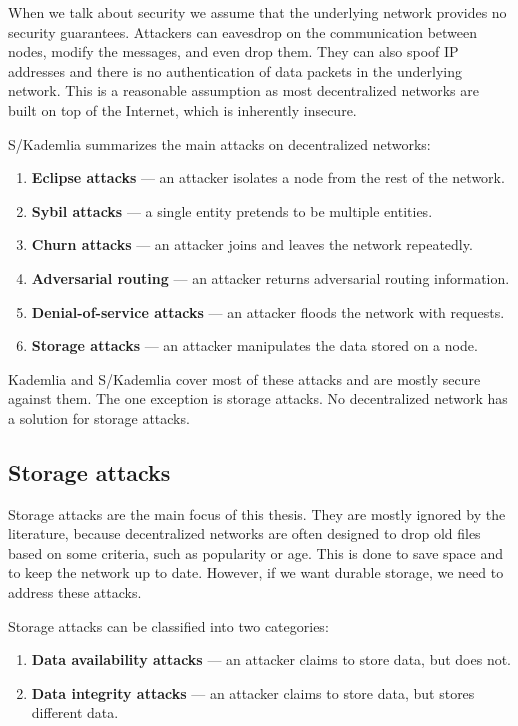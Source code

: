 When we talk about security we assume that the underlying network provides no security guarantees.
Attackers can eavesdrop on the communication between nodes, modify the messages, and even drop them.
They can also spoof IP addresses and there is no authentication of data packets in the underlying network.
This is a reasonable assumption as most decentralized networks are built on top of the Internet,
which is inherently insecure.

S/Kademlia \cite{skademlia} summarizes the main attacks on decentralized networks:
\begin{enumerate}
    \item \textbf{Eclipse attacks} --- an attacker isolates a node from the rest of the network.
    \item \textbf{Sybil attacks} --- a single entity pretends to be multiple entities.
    \item \textbf{Churn attacks} --- an attacker joins and leaves the network repeatedly.
    \item \textbf{Adversarial routing} --- an attacker returns adversarial routing information.
    \item \textbf{Denial-of-service attacks} --- an attacker floods the network with requests.
    \item \textbf{Storage attacks} --- an attacker manipulates the data stored on a node.
\end{enumerate}

Kademlia and S/Kademlia cover most of these attacks and are mostly secure against them.
The one exception is storage attacks.
No decentralized network has a solution for storage attacks.

\subsection{Storage attacks}
\label{section:storage-attacks}

Storage attacks are the main focus of this thesis.
They are mostly ignored by the literature, because decentralized networks are often designed to
drop old files based on some criteria, such as popularity or age.
This is done to save space and to keep the network up to date.
However, if we want durable storage, we need to address these attacks.

Storage attacks can be classified into two categories:
\begin{enumerate}
    \item \textbf{Data availability attacks} --- an attacker claims to store data, but does not.
    \item \textbf{Data integrity attacks} --- an attacker claims to store data, but stores different data.
\end{enumerate}

